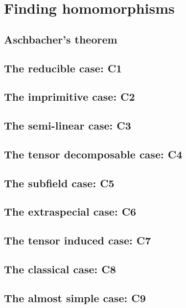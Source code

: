 
\chapter{Finding homomorphisms}
\label{chap:findhom}

\section{Aschbacher's theorem}

\section{The reducible case: C1}

\section{The imprimitive case: C2}

\section{The semi-linear case: C3}

\section{The tensor decomposable case: C4}

\section{The subfield case: C5}

\section{The extraspecial case: C6}

\section{The tensor induced case: C7}

\section{The classical case: C8}

\section{The almost simple case: C9}



